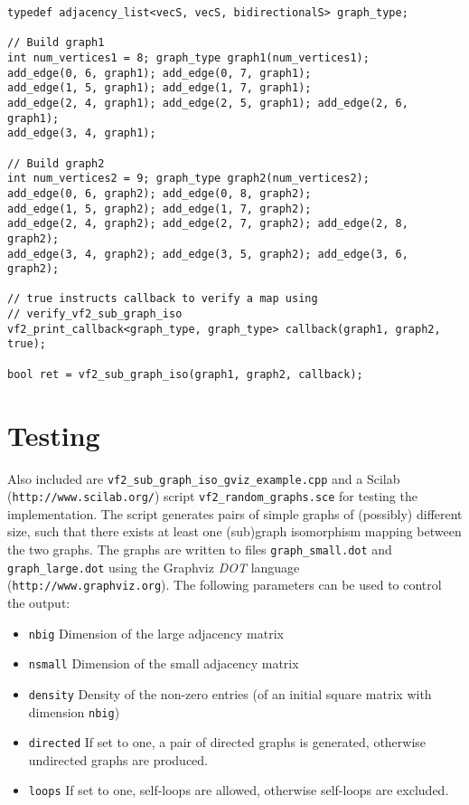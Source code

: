 \documentclass[12pt]{article}
\begin{document}
\begin{lstlisting}
typedef adjacency_list<vecS, vecS, bidirectionalS> graph_type;

// Build graph1
int num_vertices1 = 8; graph_type graph1(num_vertices1);
add_edge(0, 6, graph1); add_edge(0, 7, graph1);
add_edge(1, 5, graph1); add_edge(1, 7, graph1);
add_edge(2, 4, graph1); add_edge(2, 5, graph1); add_edge(2, 6, graph1);
add_edge(3, 4, graph1);

// Build graph2
int num_vertices2 = 9; graph_type graph2(num_vertices2);
add_edge(0, 6, graph2); add_edge(0, 8, graph2);
add_edge(1, 5, graph2); add_edge(1, 7, graph2);
add_edge(2, 4, graph2); add_edge(2, 7, graph2); add_edge(2, 8, graph2);
add_edge(3, 4, graph2); add_edge(3, 5, graph2); add_edge(3, 6, graph2);

// true instructs callback to verify a map using
// verify_vf2_sub_graph_iso
vf2_print_callback<graph_type, graph_type> callback(graph1, graph2, true);

bool ret = vf2_sub_graph_iso(graph1, graph2, callback);
\end{lstlisting}

\appendix
\section{Testing}

Also included are \verb+vf2_sub_graph_iso_gviz_example.cpp+ and a Scilab \newline
(\verb+http://www.scilab.org/+) script \verb+vf2_random_graphs.sce+ for testing the
implementation. The script generates pairs of simple graphs of (possibly) different
size, such that there exists at least one (sub)graph isomorphism mapping
between the two graphs. The graphs are written to files \verb+graph_small.dot+
and \verb+graph_large.dot+ using the Graphviz {\em DOT} language
(\verb+http://www.graphviz.org+).  The following parameters can be used to
control the output:

\begin{itemize}

\item \verb+nbig+ Dimension of the large adjacency matrix
\item \verb+nsmall+ Dimension of the small adjacency matrix
\item \verb+density+ Density of the non-zero entries (of an initial square
matrix with dimension \verb+nbig+)
\item \verb+directed+ If set to one, a pair of directed graphs is generated,
otherwise undirected graphs are produced.
\item \verb+loops+ If set to one, self-loops are allowed, otherwise self-loops
are excluded.
\end{itemize}
\end{document}
